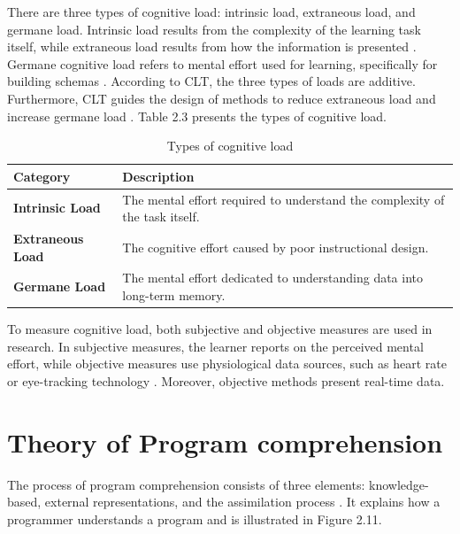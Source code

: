 There are three types of cognitive load: intrinsic load, extraneous load, and germane load. Intrinsic load results from the complexity of the learning task itself, while extraneous load results from how the information is presented \cite{schnotz2007reconsideration}. Germane cognitive load refers to mental effort used for learning, specifically for building schemas \cite{chen2009cognitive}. According to CLT, the three types of loads are additive. Furthermore, CLT guides the design of methods to reduce extraneous load and increase germane load  \cite{chen2009cognitive}. Table 2.3 presents the types of cognitive load.



\begin{table}[ht]
\centering
\small 
\caption{Types of cognitive load \cite{schnotz2007reconsideration} \cite{chen2009cognitive}}
\begin{tabular}{p{} | p{}}
\hline
\rule{0pt}{1.2em}\textbf{Category} & \textbf{Description} \\[0.5em]
\hline
\rule{0pt}{1.2em}\textbf{Intrinsic Load} & The mental effort required to understand the complexity of the task itself. \\[0.5em]
\hline
\rule{0pt}{1.2em}\textbf{Extraneous Load} & The cognitive effort caused by poor instructional design. \\[0.5em]
\hline
\rule{0pt}{1.2em}\textbf{Germane Load} & The mental effort dedicated to understanding data into long-term memory. \\[0.5em]
\hline
\end{tabular}
\label{tab:cognitive_load}
\end{table}



To measure cognitive load, both subjective and objective measures are used in research.
In subjective measures, the  learner reports on the perceived mental effort, while objective measures use physiological data sources, such as heart rate or eye-tracking technology \cite{duran2022cognitive}. Moreover, objective methods present real-time data.


\section{Theory of Program comprehension}

The process of program comprehension consists of three elements: knowledge-based, external representations, and the assimilation process \cite{kadar2021program}. It explains how a programmer understands a program and is illustrated in Figure 2.11.


